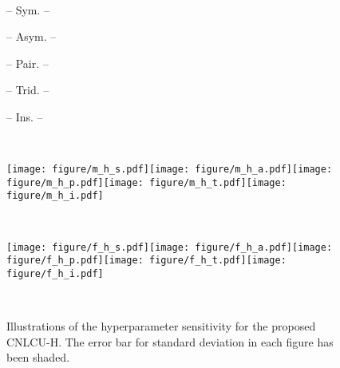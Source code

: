 \documentclass[11pt]{article}
\begin{document}
\begin{figure*}[!t]
    \centering
    \begin{minipage}[c]{0.05\columnwidth}~\end{minipage}\begin{minipage}[c]{0.187\textwidth}\centering\small -- \scriptsize{Sym.} -- \end{minipage}\begin{minipage}[c]{0.187\textwidth}\centering\small -- \scriptsize{Asym.} -- \end{minipage}\begin{minipage}[c]{0.187\textwidth}\centering\small -- \scriptsize{Pair.} -- \end{minipage}
    \begin{minipage}[c]{0.187\textwidth}\centering\small -- \scriptsize{Trid.} -- \end{minipage}
    \begin{minipage}[c]{0.187\textwidth}\centering\small -- \scriptsize{Ins.} -- \end{minipage}\\
    \begin{minipage}[c]{0.05\columnwidth}\centering\small {} \end{minipage}\begin{minipage}[c]{0.95\textwidth}
        \texttt{[image: figure/m\_h\_s.pdf]}\texttt{[image: figure/m\_h\_a.pdf]}\texttt{[image: figure/m\_h\_p.pdf]}\texttt{[image: figure/m\_h\_t.pdf]}\texttt{[image: figure/m\_h\_i.pdf]}\end{minipage}\\
    \vspace{5pt}
    \begin{minipage}[c]{0.05\columnwidth}\centering\small {} \end{minipage}\begin{minipage}[c]{0.95\textwidth}
        \texttt{[image: figure/f\_h\_s.pdf]}\texttt{[image: figure/f\_h\_a.pdf]}\texttt{[image: figure/f\_h\_p.pdf]}\texttt{[image: figure/f\_h\_t.pdf]}\texttt{[image: figure/f\_h\_i.pdf]}\end{minipage}\\
    \caption{Illustrations of the hyperparameter sensitivity for the proposed CNLCU-H. The error bar for standard deviation in each figure has been shaded.}
    \label{fig:ablation_h}
\end{figure*}
\end{document}
